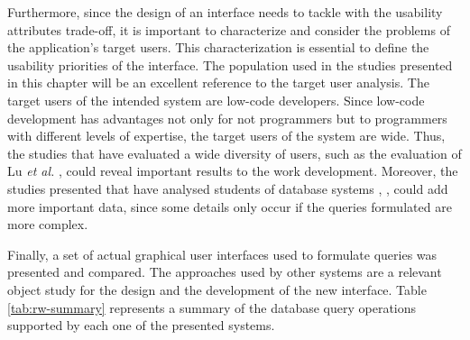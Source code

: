 Furthermore, since the design of an interface needs to tackle with the usability attributes trade-off, it is important to characterize and consider the problems of the application's target users. This characterization is essential to define the usability priorities of the interface. The population used in the studies presented in this chapter will be an excellent reference to the target user analysis. The target users of the intended system are low-code developers. Since low-code development has advantages not only for not programmers but to programmers with different levels of expertise, the target users of the system are wide. Thus, the studies that have evaluated a wide diversity of users, such as the evaluation of Lu \textit{et al.} \cite{aSurveyOnUsageOfSQL}, could reveal important results to the work development. Moreover, the studies presented that have analysed students of database systems \cite{studentsSemanticMistakesInWritingSevenDifferentTypesOfSQLQueries}, \cite{errorsAndComplicationsInSQLQueryFormulation}, could add more important data, since some details only occur if the queries formulated are more complex.

Finally, a set of actual graphical user interfaces used to formulate queries was presented and compared. The approaches used by other systems are a relevant object study for the design and the development of the new interface. Table \ref{tab:rw-summary} represents a summary of the database query operations supported by each one of the presented systems.

